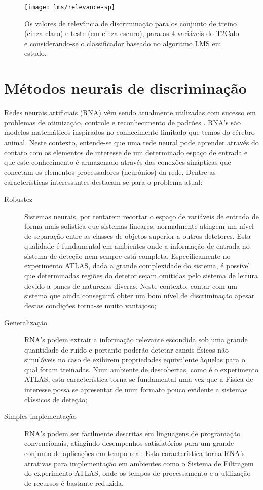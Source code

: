 \begin{figure}
\begin{center}
\texttt{[image: lms/relevance-sp]}
\end{center}
\caption{Os valores de relevância de discriminação para os conjunto de treino
(cinza claro) e teste (em cinza escuro), para as 4 variáveis do T2Calo e
considerando-se o classificador baseado no algoritmo LMS em estudo.}
\label{fig:relevance-sp}
\end{figure}

\section{Métodos neurais de discriminação}
\label{sec:neural}

Redes neurais artificiais (RNA) vêm sendo atualmente utilizadas com sucesso em
problemas de otimização, controle e reconhecimento de padrões
\cite{haykin}. RNA's são modelos matemáticos inspirados no conhecimento
limitado que temos do cérebro animal. Neste contexto, entende-se que uma rede
neural pode aprender através do contato com os elementos de interesse de um
determinado espaço de entrada e que este conhecimento é armazenado através das
conexões sinápticas que conectam os elementos processadores (neurônios) da
rede. Dentre as características interessantes destacam-se para o problema
atual:

\begin{description}
\item[Robustez] Sistemas neurais, por tentarem recortar o espaço de variáveis
de entrada de forma mais sofistica que sistemas lineares, normalmente atingem
um nível de separação entre as classes de objetos superior a outros
detetores. Esta qualidade é fundamental em ambientes onde a informação de
entrada no sistema de deteção nem sempre está completa. Especificamente no
experimento ATLAS, dada a grande complexidade do sistema, é possível que
determinadas regiões do detetor sejam omitidas pelo sistema de leitura devido
a panes de naturezas diveras. Neste contexto, contar com um sistema que ainda
conseguirá obter um bom nível de discriminação apesar destas condições
torna-se muito vantajoso;

\item[Generalização] RNA's podem extrair a informação relevante escondida sob
uma grande quantidade de ruído e portanto poderão detetar canais físicos não
simuláveis no caso de exibirem propriedades equivalente àquelas para o qual
foram treinadas. Num ambiente de descobertas, como é o experimento ATLAS, esta
característica torna-se fundamental uma vez que a Física de interesse possa se
apresentar de num formato pouco evidente a sistemas clássicos de deteção;

\item[Simples implementação] RNA's podem ser facilmente descritas em
linguagens de programação convencionais, atingindo desempenhos satisfatórios
para um grande conjunto de aplicações em tempo real. Esta característica torna
RNA's atrativas para implementação em ambientes como o Sistema de Filtragem do
experimento ATLAS, onde os tempos de processamento e a utilização de recursos
é bastante reduzida.
\end{description}

